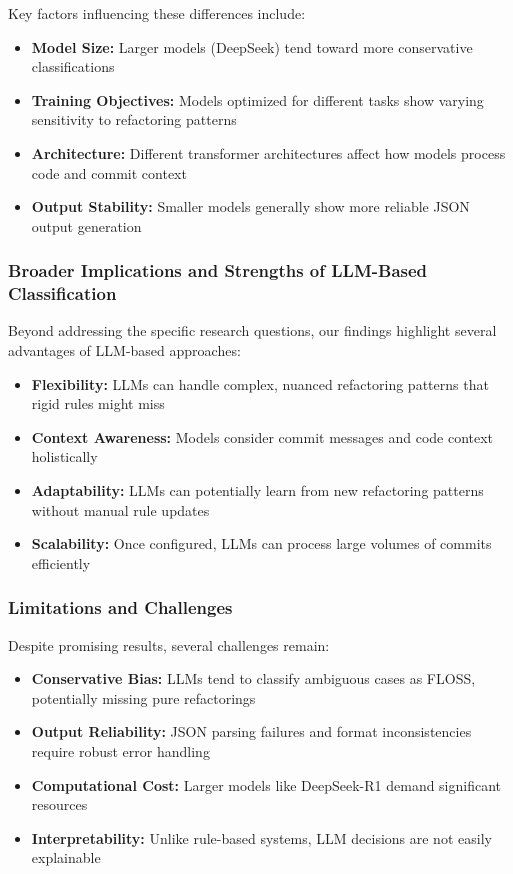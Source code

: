 Key factors influencing these differences include:
\begin{itemize}
    \item \textbf{Model Size:} Larger models (DeepSeek) tend toward more conservative classifications
    \item \textbf{Training Objectives:} Models optimized for different tasks show varying sensitivity to refactoring patterns
    \item \textbf{Architecture:} Different transformer architectures affect how models process code and commit context
    \item \textbf{Output Stability:} Smaller models generally show more reliable JSON output generation
\end{itemize}

\subsubsection{Broader Implications and Strengths of LLM-Based Classification}

Beyond addressing the specific research questions, our findings highlight several advantages of LLM-based approaches:

\begin{itemize}
    \item \textbf{Flexibility:} LLMs can handle complex, nuanced refactoring patterns that rigid rules might miss
    \item \textbf{Context Awareness:} Models consider commit messages and code context holistically
    \item \textbf{Adaptability:} LLMs can potentially learn from new refactoring patterns without manual rule updates
    \item \textbf{Scalability:} Once configured, LLMs can process large volumes of commits efficiently
\end{itemize}

\subsubsection{Limitations and Challenges}

Despite promising results, several challenges remain:

\begin{itemize}
    \item \textbf{Conservative Bias:} LLMs tend to classify ambiguous cases as FLOSS, potentially missing pure refactorings
    \item \textbf{Output Reliability:} JSON parsing failures and format inconsistencies require robust error handling
    \item \textbf{Computational Cost:} Larger models like DeepSeek-R1 demand significant resources
    \item \textbf{Interpretability:} Unlike rule-based systems, LLM decisions are not easily explainable
\end{itemize}

